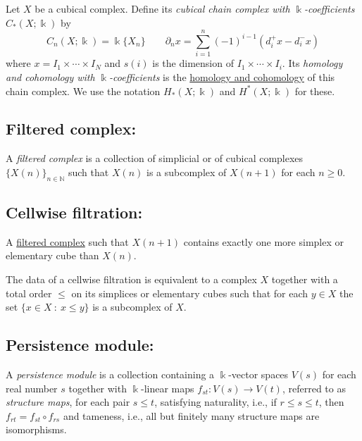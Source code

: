 \documentclass{amsart}
\begin{document}
	Let $X$ be a cubical complex. Define its \textit{cubical chain complex with $\Bbbk$-coefficients} $C_*(X; \Bbbk)$ by 
	\begin{equation*}
	C_n(X; \Bbbk) = \Bbbk\{X_n\} \qquad \partial_n x = \sum_{i = 1}^{n} (-1)^{i-1}(d^+_i x - d^-_i x)
	\end{equation*}
	where $x = I_1 \times \cdots \times I_N$ and $s(i)$ is the dimension of $I_1 \times \cdots \times I_i$.
	Its \textit{homology and cohomology with $\Bbbk$-coefficients} is the \hyperref[homology and cohomology]{homology and cohomology} of this chain complex. We use the notation $H_*(X; \Bbbk)$ and $H^*(X; \Bbbk)$ for these.
	
	\subsection*{Filtered complex:} \label{filtered complex}
	
	A \textit{filtered complex} is a collection of simplicial or of cubical complexes $\{X(n)\}_{n \in \mathbb N}$ such that $X(n)$ is a subcomplex of $X(n+1)$ for each $n \geq 0$.
	
	\subsection*{Cellwise filtration:} \label{cellwise filtration}
	
	A \hyperref[filtered complex]{filtered complex} such that $X(n+1)$ contains exactly one more simplex or elementary cube than $X(n)$. \par
	The data of a cellwise filtration is equivalent to a complex $X$ together with a total order $\leq$ on its simplices or elementary cubes such that for each $y \in X$ the set $\{x \in X\ :\ x \leq y\}$ is a subcomplex of $X$.
	
	\subsection*{Persistence module:} \label{persistence module}
	
	A \textit{persistence module} is a collection containing a $\Bbbk$-vector spaces $V(s)$ for each real number $s$ together with $\Bbbk$-linear maps $f_{st} : V(s) \to V(t)$, referred to as \textit{structure maps}, for each pair $s \leq t$, satisfying	naturality, i.e., if $r \leq s \leq t$, then $f_{rt} = f_{st} \circ f_{rs}$ and tameness, i.e., all but finitely many structure maps are isomorphisms.
	
\end{document}
